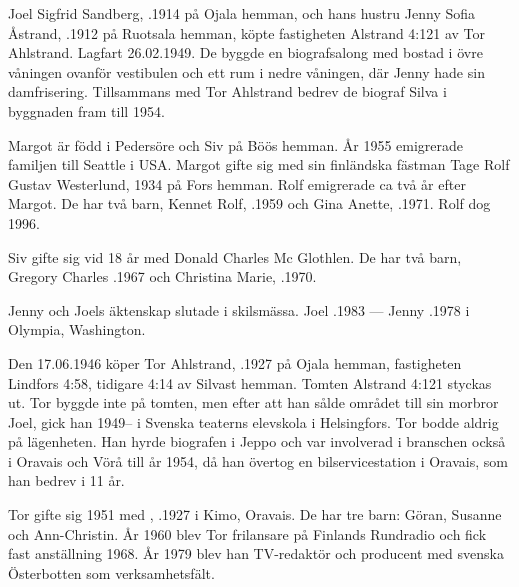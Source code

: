 Joel Sigfrid Sandberg, .1914 på Ojala hemman, och hans hustru Jenny Sofia Åstrand, .1912 på	Ruotsala hemman, köpte fastigheten Alstrand 4:121 av Tor Ahlstrand. Lagfart 26.02.1949. De byggde en biografsalong med bostad i övre våningen ovanför vestibulen och ett rum	i nedre våningen, där Jenny hade sin damfrisering. Tillsammans med Tor Ahlstrand bedrev de biograf Silva i byggnaden fram till 1954.
\begin{jhchildren}
  \item {}
  \item {}
\end{jhchildren}
Margot är född i Pedersöre och Siv på Böös hemman. År 1955 emigrerade familjen till Seattle i USA. Margot gifte sig	med sin finländska fästman Tage Rolf Gustav Westerlund,  1934 på Fors hemman. Rolf emigrerade ca två år efter Margot. De har två barn, Kennet Rolf, .1959 och Gina Anette, .1971. Rolf dog 1996.

Siv gifte sig vid 18 år med Donald Charles Mc Glothlen. De har två barn, Gregory Charles .1967 och Christina Marie, .1970.

Jenny och Joels äktenskap slutade i skilsmässa.	Joel .1983  ---  Jenny .1978 i Olympia, Washington.


Den 17.06.1946 köper Tor Ahlstrand, .1927 på Ojala hemman, fastigheten Lindfors 4:58, tidigare 4:14 av Silvast hemman. Tomten Alstrand 4:121 styckas ut. Tor byggde inte på tomten, men efter att han sålde området till sin morbror Joel, gick han 1949-- i Svenska teaterns elevskola i Helsingfors. Tor bodde aldrig på lägenheten. Han hyrde biografen i Jeppo och var involverad i branschen också i Oravais och Vörå till år 1954, då han övertog en bilservicestation i Oravais, som han bedrev i 11 år.

Tor gifte sig 1951 med , .1927 i Kimo, Oravais. De har tre barn: Göran, Susanne och Ann-Christin.	År 1960 blev Tor frilansare på Finlands Rundradio och fick fast anställning 1968. År 1979 blev han TV-redaktör och producent med svenska Österbotten som verksamhetsfält.


